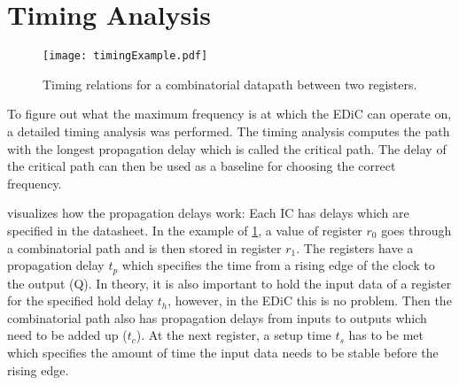 \section{Timing Analysis}\label{sec:timing}
\begin{figure}[t]
  \centering
  \texttt{[image: timingExample.pdf]}
  \caption{Timing relations for a combinatorial datapath between two registers.}
  \label{fig:timingExample}
\end{figure}
To figure out what the maximum frequency is at which the \gls{EDiC} can operate on, a detailed timing analysis was performed.
The timing analysis computes the path with the longest propagation delay which is called the critical path.
The delay of the critical path can then be used as a baseline for choosing the correct frequency.

 visualizes how the propagation delays work:
Each \gls{IC} has delays which are specified in the datasheet.
In the example of \cref{fig:timingExample}, a value of register $r_0$ goes through a combinatorial path and is then stored in register $r_1$.
The registers have a propagation delay $t_p$ which specifies the time from a rising edge of the clock to the output (Q).
In theory, it is also important to hold the input data of a register for the specified hold delay $t_h$, however, in the \gls{EDiC} this is no problem.
Then the combinatorial path also has propagation delays from inputs to outputs which need to be added up ($t_c$).
At the next register, a setup time $t_s$ has to be met which specifies the amount of time the input data needs to be stable before the rising edge.

